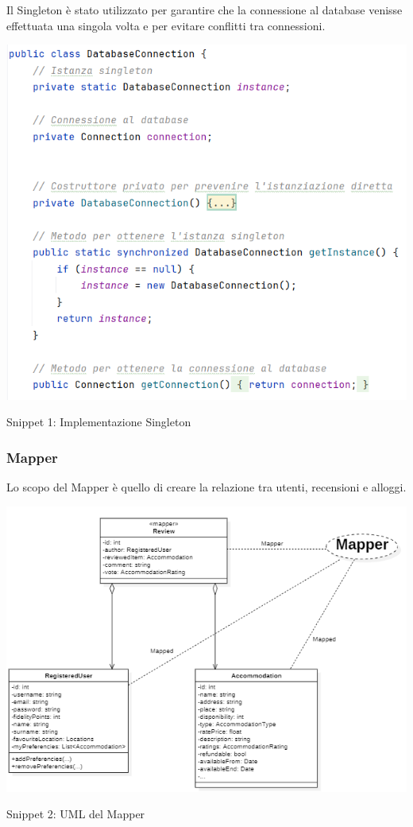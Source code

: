 \documentclass[10pt]{article}
\begin{document}
Il Singleton è stato utilizzato per garantire che la connessione al database venisse effettuata una singola volta e per evitare conflitti tra connessioni.
\par\medskip
\vspace{-0.3cm}
\begin{center}
\includegraphics[scale=0.65]{Snippets/Singleton}
\par\medskip
Snippet 1: Implementazione Singleton
\par\medskip
\end{center}

\subsubsection{Mapper}

Lo scopo del Mapper è quello di creare la relazione tra utenti, recensioni e alloggi.

\begin{center}
\includegraphics[scale=0.75]{Snippets/Mapper}
\par\medskip
Snippet 2: UML del Mapper
\par\medskip
\end{center}
\end{document}
